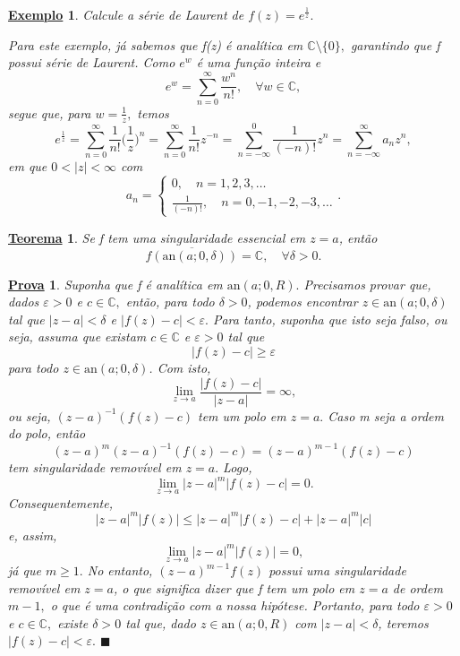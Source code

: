 \documentclass{article}
\newtheorem*{theorem*}{\underline{Teorema}}
\newtheorem{example}{\underline{Exemplo}}[section]
\newtheorem*{proof*}{\underline{Prova}}
\renewcommand\qedsymbol{$\blacksquare$}
\begin{document}
  \begin{example}
    Calcule a série de Laurent de \(f(z) = e^{\frac{1}{z}}.\)

    Para este exemplo, já sabemos que f(z) é analítica em \(\mathbb{C}\setminus{\{0\}},\) garantindo que f possui série de Laurent.
    Como \(e^{w}\) é uma função inteira e 
    \[
      e^{w} = \sum\limits_{n=0}^{\infty}\frac{w^{n}}{n!},\quad \forall w\in \mathbb{C},
    \]
    segue que, para \(w = \frac{1}{z},\) temos 
    \[
      e^{\frac{1}{z}}=\sum\limits_{n=0}^{\infty}\frac{1}{n!}\biggl(\frac{1}{z}\biggr)^{n} = \sum\limits_{n=0}^{\infty}\frac{1}{n!}z^{-n} = \sum\limits_{n=-\infty}^{0}\frac{1}{(-n)!}z^{n} = \sum\limits_{n=-\infty}^{\infty}a_{n}z^{n},
    \]
    em que \(0 < |z| < \infty\) com 
    \[
      a_{n}  = \left\{\begin{array}{ll}
          0,\quad n=1, 2, 3,\dotsc \\
          \frac{1}{(-n)!},\quad n = 0, -1, -2, -3, \dotsc 
      \end{array}\right. .
    \]
  \end{example}
  \hypertarget{casorati-weierstrass}{
    \begin{theorem*}
      Se f tem uma singularidade essencial em \(z=a\), então 
      \[
        \overline{f(\mathrm{an}(a; 0, \delta ))} = \mathbb{C},\quad \forall \delta > 0.
      \]
  \end{theorem*}}
  \begin{proof*}
    Suponha que f é analítica em \(\mathrm{an}(a; 0, R).\) Precisamos provar que, dados \(\varepsilon > 0\) e \(c\in \mathbb{C},\) então, para todo \(\delta >0\),
    podemos encontrar \(z\in \mathrm{an}(a; 0, \delta )\) tal que \(|z-a| < \delta \) e \(|f(z) - c| < \varepsilon .\) Para tanto, suponha que isto seja falso, ou seja, assuma que existam
    \(c\in \mathbb{C}\) e \(\varepsilon > 0\) tal que 
    \[
      |f(z) - c| \geq \varepsilon 
    \]
    para todo \(z\in \mathrm{an}(a; 0, \delta )\). Com isto,
    \[
      \lim_{z\to a}\frac{|f(z)-c|}{|z-a|} = \infty,
    \]
    ou seja, \((z-a)^{-1}(f(z)-c)\) tem um polo em \(z=a.\) Caso m seja a ordem do polo, então 
    \[
      (z-a)^{m}(z-a)^{-1}(f(z)-c) = (z-a)^{m-1}(f(z)-c)
    \]
    tem singularidade removível em \(z=a.\) Logo, 
    \[
      \lim_{z\to a}|z-a|^{m}|f(z)-c| = 0.
    \]
    Consequentemente,
    \[
      |z-a|^{m}|f(z)|\leq |z-a|^{m}|f(z)-c| + |z-a|^{m}|c|
    \]
    e, assim,
    \[
      \lim_{z\to a}|z-a|^{m}|f(z)| = 0,
    \]
    já que \(m\geq 1.\) No entanto, \((z-a)^{m-1}f(z)\) possui uma singularidade removível em \(z=a\), o que significa dizer que 
    f tem um polo em \(z=a\) de ordem \(m-1,\) o que é uma contradição com a nossa hipótese. Portanto, para todo \(\varepsilon >0\) e \(c\in \mathbb{C},\)
    existe \(\delta > 0\) tal que, dado \(z\in \mathrm{an}(a; 0, R)\) com \(|z-a| < \delta \), teremos \(|f(z) - c| < \varepsilon .\) \qedsymbol
  \end{proof*}
  \newpage
\end{document}
